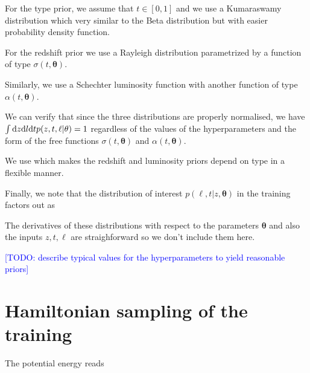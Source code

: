\documentclass[aps,prd,showpacs,superscriptaddress,groupedaddress]{revtex4}  %
\newcommand{\todo}[1]{\textcolor{blue}{[TODO: #1]}}
\begin{document}
For the type prior, we assume that $t\in[0,1]$ and we use a Kumaraswamy distribution
which very similar to the Beta distribution but with easier probability density function.

For the redshift prior we use a Rayleigh distribution
parametrized by a function of type $\sigma(t,\bm{\theta})$.

Similarly, we use a Schechter luminosity function
with another function of type $\alpha(t,\bm{\theta})$.

We can verify that since the three distributions are properly normalised, we have $\int\d z\d l \d t p(z,t,\ell | \vec{\theta}) = 1$ regardless of the values of the hyperparameters and the form of the free functions $\sigma(t,\bm{\theta})$ and $\alpha(t,\bm{\theta})$.

We use 
which makes the redshift and luminosity priors depend on type in a flexible manner.

Finally, we note that the distribution of interest $p(\ell,t|z,\bm{\theta})$ in the training factors out as
 
The derivatives of these distributions with respect to the parameters $\bm{\theta}$ and also the inputs $z,t,\ell$ are straighforward so we don't include them here.

\todo{describe typical values for the hyperparameters to yield reasonable priors}



\section{Hamiltonian sampling of the training}

The potential energy reads
	
\end{document}

